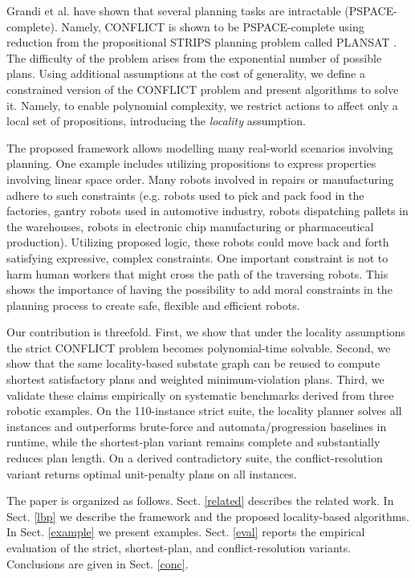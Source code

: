 \documentclass[a4paper,fleqn]{cas-dc}
\begin{document}
Grandi et al. \cite{grandi2022logic} have shown that several planning tasks are intractable (PSPACE-complete). Namely, CONFLICT is shown to be PSPACE-complete using reduction from the propositional STRIPS planning problem called PLANSAT \cite{BYLANDER1994165}. The difficulty of the problem arises from the exponential number of possible plans.
Using additional assumptions at the cost of generality, we define a constrained version of the CONFLICT problem and present algorithms to solve it. Namely, to enable polynomial complexity, we restrict actions to affect only a local set of propositions, introducing the {\it locality} assumption. 

The proposed framework allows modelling many real-world scenarios involving planning. One example includes utilizing propositions to express properties involving linear space order. Many robots involved in repairs or manufacturing adhere to such constraints (e.g. robots used to pick and pack food in the factories, gantry robots used in automotive industry, robots dispatching pallets in the warehouses, robots in electronic chip manufacturing or pharmaceutical production). Utilizing proposed logic, these robots could move back and forth satisfying expressive, complex constraints. One important constraint is not to harm human workers that might cross the path of the traversing robots. This shows the importance of having the possibility to add moral constraints in the planning process  to create safe, flexible and efficient robots.    

Our contribution is threefold. First, we show that under the locality assumptions the strict CONFLICT problem becomes polynomial-time solvable. Second, we show that the same locality-based substate graph can be reused to compute shortest satisfactory plans and weighted minimum-violation plans. Third, we validate these claims empirically on systematic benchmarks derived from three robotic examples. On the 110-instance strict suite, the locality planner solves all instances and outperforms brute-force and automata/progression baselines in runtime, while the shortest-plan variant remains complete and substantially reduces plan length. On a derived contradictory suite, the conflict-resolution variant returns optimal unit-penalty plans on all instances.

The paper is organized as follows. Sect. \ref{related} describes the related work. In Sect. \ref{lbp} we describe the framework and the proposed locality-based algorithms. In Sect. \ref{example} we present examples. Sect. \ref{eval} reports the empirical evaluation of the strict, shortest-plan, and conflict-resolution variants. Conclusions are given in Sect. \ref{conc}.
\end{document}
